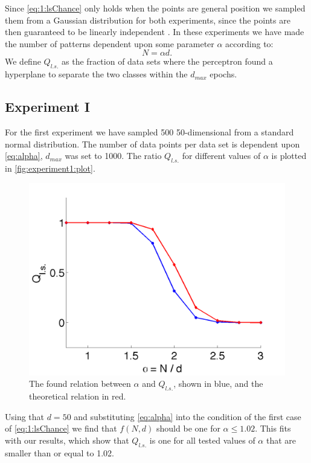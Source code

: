 Since \autoref{eq:1:lsChance} only holds when the points are general position we sampled them from a Gaussian distribution for both experiments, since the points are then guaranteed to be linearly independent \cite[Chapter~5]{prince2012computer}. In these experiments we have made the number of patterns dependent upon some parameter $\alpha$ according to: 
	\begin{equation}\label{eq:alpha}
		N = \alpha d.
	\end{equation}
We define $Q_{l.s.}$ as the fraction of data sets where the perceptron found a hyperplane to separate the two classes within the $d_{max}$ epochs.	

\subsection*{Experiment I}
For the first experiment we have sampled 500 50-dimensional from a standard normal distribution. The number of data points per data set is dependent upon \eqref{eq:alpha}, $d_{max}$ was set to 1000. The ratio $Q_{l.s.}$ for different values of $\alpha$ is plotted in \autoref{fig:experiment1:plot}.

\begin{figure}[H]
	\centering
	\includegraphics[width=\columnwidth]{./img/Aa_N50_nd500_nmax1000}
	\caption{The found relation between $\alpha$ and $Q_{l.s.}$, shown in blue, and the theoretical relation in red.}
	\label{fig:experiment1:plot}
\end{figure}

Using that $d = 50$  and substituting \eqref{eq:alpha} into the condition of the first case of \eqref{eq:1:lsChance} we find that $f(N,d)$ should be one for $\alpha \leq 1.02$. This fits with our results, which show that $Q_{l.s.}$ is one for all tested values of $\alpha$ that are smaller than or equal to 1.02. 

